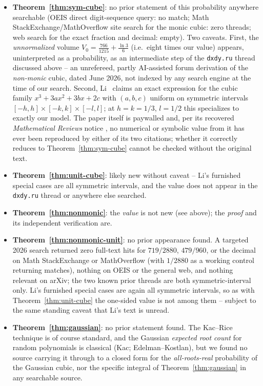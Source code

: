 \documentclass[11pt,reqno]{amsart}
\theoremstyle{plain}
\theoremstyle{remark}
\begin{document}
\begin{itemize}
\item \textbf{Theorem~\ref{thm:sym-cube}}: no prior statement of this
  probability anywhere searchable (OEIS direct digit-sequence query: no
  match; Math StackExchange/MathOverflow site search for the monic cubic:
  zero threads; web search for the exact fraction and decimal: empty). Two
  caveats. First, the \emph{unnormalized} volume $V_0=\tfrac{766}{1215}+\tfrac{\ln3}{6}$
  (i.e.\ eight times our value) appears, uninterpreted as a probability, as an
  intermediate step of the \texttt{dxdy.ru} thread discussed above -- an
  unrefereed, partly AI-assisted forum derivation of the \emph{non-monic}
  cubic, dated June 2026, not indexed by any search engine at the time of our
  search. Second, Li~\cite{li1988} claims an exact expression for the cubic
  family $x^3+3ax^2+3bx+2c$ with $(a,b,c)$ uniform on symmetric intervals
  $[-h,h]\times[-k,k]\times[-l,l]$; at $h=k=1/3$, $l=1/2$ this specializes to
  exactly our model. The paper itself is paywalled and, per its recovered
  \emph{Mathematical Reviews} notice \cite{li1988-mr}, no numerical or
  symbolic value from it has ever been reproduced by either of its two
  citations; whether it correctly reduces to Theorem~\ref{thm:sym-cube}
  cannot be checked without the original text.
\item \textbf{Theorem~\ref{thm:unit-cube}}: likely new without caveat -- Li's
  furnished special cases are all symmetric intervals, and the value does not
  appear in the \texttt{dxdy.ru} thread or anywhere else searched.
\item \textbf{Theorem~\ref{thm:nonmonic}}: the \emph{value} is not new (see
  above); the \emph{proof} and its independent verification are.
\item \textbf{Theorem~\ref{thm:nonmonic-unit}}: no prior appearance found. A
  targeted 2026 search returned zero full-text hits for $719/2880$,
  $479/960$, or the decimal on Math StackExchange or MathOverflow (with
  $1/2880$ as a working control returning matches), nothing on OEIS or the
  general web, and nothing relevant on arXiv; the two known prior threads are
  both symmetric-interval only. Li's furnished special cases are again all
  symmetric intervals, so as with Theorem~\ref{thm:unit-cube} the one-sided
  value is not among them -- subject to the same standing caveat that Li's
  text is unread.
\item \textbf{Theorem~\ref{thm:gaussian}}: no prior statement found. The
  Kac--Rice technique is of course standard, and the Gaussian
  \emph{expected root count} for random polynomials is classical
  (Kac; Edelman--Kostlan), but we found no source carrying it through to a
  closed form for the \emph{all-roots-real} probability of the Gaussian
  cubic, nor the specific integral of Theorem~\ref{thm:gaussian} in any
  searchable source.
\end{itemize}
\end{document}
